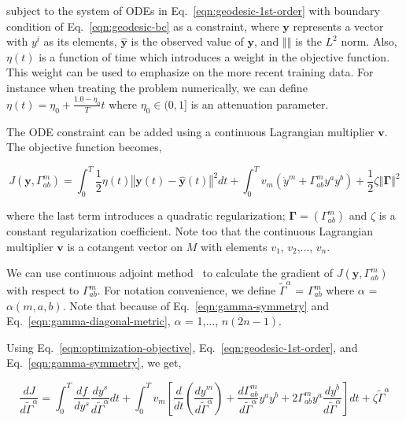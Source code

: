 \documentclass{article}
\begin{document}
subject to the system of ODEs in Eq.~\ref{eqn:geodesic-1st-order} with
boundary condition of Eq.~\ref{eqn:geodesic-bc} as a constraint, where
$\boldsymbol{y}$ represents a vector with $y^{i}$ as its elements,
$\hat{\boldsymbol{y}}$ is the observed value of $\boldsymbol{y}$, and
$\left\Vert \right\Vert$ is the $L^{2}$ norm. Also, $\eta(t)$ is a
function of time which introduces a weight in the objective
function. This weight can be used to emphasize on the more recent
training data. For instance when treating the problem numerically, we
can define $\eta(t) = \eta_{0} + \frac{1.0 - \eta_{0}}{T} t$ where
$\eta_{0} \in (0,1]$ is an attenuation parameter.

The ODE constraint can be added using a continuous Lagrangian
multiplier $\boldsymbol{v}$. The objective function becomes,

\begin{equation}\label{eqn:optimization-objective}
J(\boldsymbol{y},\Gamma^{m}_{ab}) = \int_{0}^{T} \frac{1}{2} \eta(t)
\left\Vert \boldsymbol{y}(t) - \hat{\boldsymbol{y}}(t) \right\Vert^{2} dt +
\int_{0}^{T} v_{m} \left( \dot{y}^{m} + \Gamma^{m}_{ab} y^{a} y^{b}
\right) + \frac{1}{2} \zeta \left\Vert \boldsymbol{\Gamma} \right\Vert^{2}
\end{equation}

where the last term introduces a quadratic regularization;
$\boldsymbol{\Gamma} = \left(\Gamma^{m}_{ab}\right)$ and $\zeta$ is a
constant regularization coefficient. Note too that the continuous
Lagrangian multiplier $\boldsymbol{v}$ is a cotangent vector on $M$
with elements $v_{1}$, $v_{2}$,..., $v_{n}$.

We can use continuous adjoint method~\cite{ref:adjoint-giles} to
calculate the gradient of $J(\boldsymbol{y},\Gamma^{m}_{ab})$ with
respect to $\Gamma^{m}_{ab}$. For notation convenience, we define
$\tilde{\Gamma}^{\alpha}$ = $\Gamma^{m}_{ab}$ where $\alpha$ =
$\alpha(m,a,b)$. Note that because of Eq.~\ref{eqn:gamma-symmetry} and
Eq.~\ref{eqn:gamma-diagonal-metric}, $\alpha$ = 1,..., $n (2n - 1)$.

Using Eq.~\ref{eqn:optimization-objective},
Eq.~\ref{eqn:geodesic-1st-order}, and Eq.~\ref{eqn:gamma-symmetry}, we
get,

\begin{equation}\label{eqn:objective-gradient-raw}
\frac{d J}{d \tilde{\Gamma}^{\alpha}} = \int_{0}^{T}
\frac{df}{dy^{s}}\frac{d y^{s}}{d \tilde{\Gamma}^{\alpha}} dt +
\int_{0}^{T} v_{m} \left[ \frac{d}{dt}(\frac{d y^{m}}{d
    \tilde{\Gamma}^{\alpha}}) + \frac{d \Gamma^{m}_{ab}}{d
    \tilde{\Gamma}^{\alpha}} y^{a} y^{b} + 2 \Gamma^{m}_{ab} y^{a}
  \frac{d y^{b}}{d \tilde{\Gamma}^{\alpha}} \right] dt + \zeta
\tilde{\Gamma}^{\alpha}
\end{equation}
\end{document}
